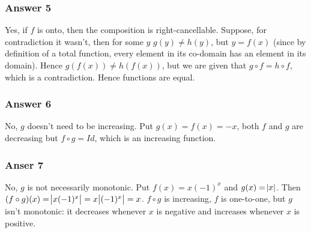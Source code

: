 \documentclass[11pt]{article}
\begin{document}
\subsubsection{Answer 5}
\label{sec-1-2-3}
Yes, if $f$ is onto, then the composition is right-cancellable.  Suppose,
for contradiction it wasn't, then for some $y$ $g(y) \neq h(y)$, but
$y = f(x)$ (since by definition of a total function, every element in
its co-domain has an element in its domain).  Hence $g(f(x)) \neq h(f(x))$,
but we are given that $g \circ f = h \circ f$, which is a contradiction.
Hence functions are equal.
\subsubsection{Answer 6}
\label{sec-1-2-4}
No, $g$ doesn't need to be increasing.  Put $g(x) = f(x) = -x$, both $f$
and $g$ are decreasing but $f \circ g = Id$, which is an increasing function.
\subsubsection{Anser 7}
\label{sec-1-2-5}
No, $g$ is not necessarily monotonic.  Put $f(x) = x(-1)^x$ and $g(x) = \abs{x}$.
Then $(f \circ g)(x) = \abs{x(-1)^x} = x\abs{(-1)^x} = x$.  $f \circ g$ is
increasing, $f$ is one-to-one, but $g$ isn't monotonic: it decreases whenever
$x$ is negative and increases whenever $x$ is positive.
\end{document}
